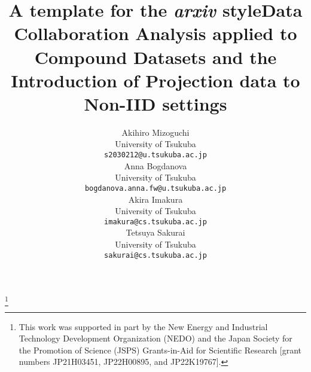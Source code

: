 \documentclass{article}
\title{A template for the \emph{arxiv} style}
\begin{document}
\title{Data Collaboration Analysis applied to Compound Datasets and the Introduction of Projection data to Non-IID settings}

\author{
 Akihiro Mizoguchi \\
  University of Tsukuba \\
  \texttt{s2030212@u.tsukuba.ac.jp} \\
   \And
 Anna Bogdanova \\
  University of Tsukuba \\
  \texttt{bogdanova.anna.fw@u.tsukuba.ac.jp} \\
  \And
 Akira Imakura \\
  University of Tsukuba \\
  \texttt{imakura@cs.tsukuba.ac.jp} \\
  \And
 Tetsuya Sakurai \\
  University of Tsukuba \\
  \texttt{sakurai@cs.tsukuba.ac.jp} \\
}

\thanks{This work was supported in part by the New Energy and Industrial Technology Development Organization (NEDO) and the Japan Society for the Promotion of Science (JSPS) Grants-in-Aid for Scientific Research [grant numbers JP21H03451, JP22H00895, and JP22K19767].}


\maketitle
\end{document}
